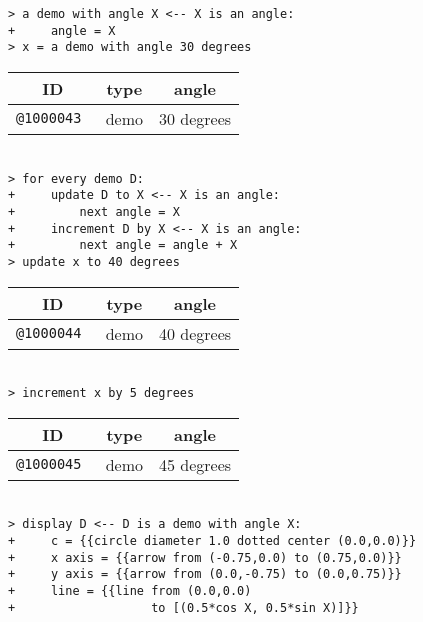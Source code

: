 \documentclass[12pt]{article}
\newenvironment{indpar}[1][0.3in]%
	{\begin{list}{}%
		     {\setlength{\itemsep}{0in}%
		      \setlength{\topsep}{0in}%
		      \setlength{\parsep}{1ex}%
		      \setlength{\labelwidth}{#1}%
		      \setlength{\leftmargin}{#1}%
		      \addtolength{\leftmargin}{\labelsep}}%
	 \item}%
	{\end{list}}
\begin{document}
\begin{indpar}
\verb|> a demo with angle X <-- X is an angle:| \\
\verb|+     angle = X| \\
\verb|> x = a demo with angle 30 degrees| \\
\begin{tabular}{|r|r|r|}
\hline
\multicolumn{1}{|c}{\bf ID} &
\multicolumn{1}{|c}{\bf type} &
\multicolumn{1}{|c|}{\bf angle} \\
\hline
\tt @1000043 & demo & 30 degrees \\
\hline
\end{tabular} \\[0.5ex]
\verb|> for every demo D:| \\
\verb|+     update D to X <-- X is an angle:|\\
\verb|+         next angle = X| \\
\verb|+     increment D by X <-- X is an angle:| \\
\verb|+         next angle = angle + X| \\
\verb|> update x to 40 degrees| \\
\begin{tabular}{|r|r|r|}
\hline
\multicolumn{1}{|c}{\bf ID} &
\multicolumn{1}{|c}{\bf type} &
\multicolumn{1}{|c|}{\bf angle} \\
\hline
\tt @1000044 & demo & 40 degrees \\
\hline
\end{tabular} \\[0.5ex]
\verb|> increment x by 5 degrees| \\
\begin{tabular}{|r|r|r|}
\hline
\multicolumn{1}{|c}{\bf ID} &
\multicolumn{1}{|c}{\bf type} &
\multicolumn{1}{|c|}{\bf angle} \\
\hline
\tt @1000045 & demo & 45 degrees \\
\hline
\end{tabular} \\[0.5ex]
\verb/> display D <-- D is a demo with angle X:/ \\
\verb/+     c = {{circle diameter 1.0 dotted center (0.0,0.0)}}/ \\
\verb/+     x axis = {{arrow from (-0.75,0.0) to (0.75,0.0)}}/ \\
\verb/+     y axis = {{arrow from (0.0,-0.75) to (0.0,0.75)}}/ \\
\verb/+     line = {{line from (0.0,0.0)/ \\
\verb/+                   to [(0.5*cos X, 0.5*sin X)]}}/ \\

\end{indpar}
\end{document}
